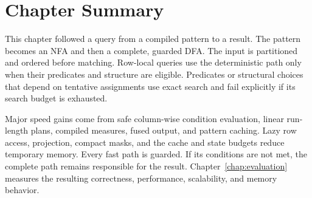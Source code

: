 \section{Chapter Summary}
\label{sec:impl-summary}

This chapter followed a query from a compiled pattern to a result.  The
pattern becomes an NFA and then a complete, guarded DFA.  The input is
partitioned and ordered before matching.  Row-local queries use the
deterministic path only when their predicates and structure are
eligible.  Predicates or structural choices that depend on tentative
assignments use exact search and fail explicitly if its search budget
is exhausted.

Major speed gains come from safe column-wise condition evaluation,
linear run-length plans, compiled measures, fused output, and pattern
caching.  Lazy row access,
projection, compact masks, and the cache and state budgets reduce
temporary memory.  Every fast path is guarded.  If its conditions are
not met, the complete path remains responsible for the result.
Chapter~\ref{chap:evaluation} measures the resulting correctness,
performance, scalability, and memory behavior.
